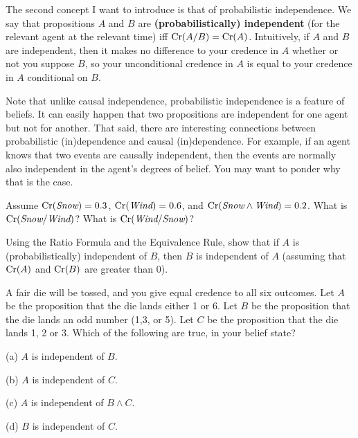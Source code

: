 The second concept I want to introduce is that of probabilistic
independence. We say that propositions $A$ and $B$ are
\textbf{(probabilistically) independent} (for the relevant agent at
the relevant time) iff $\text{Cr}(A/B) = \text{Cr}(A)$. Intuitively, if $A$ and $B$
are independent, then it makes no difference to your credence in $A$
whether or not you suppose $B$, so your unconditional credence in $A$
is equal to your credence in $A$ conditional on $B$.

Note that unlike causal independence, probabilistic independence is a
feature of beliefs. It can easily happen that two propositions are
independent for one agent but not for another. That said, there are
interesting connections between probabilistic (in)dependence and
causal (in)dependence. For example, if an agent knows that two events
are causally independent, then the events are normally also
independent in the agent's degrees of belief. You may want to ponder
why that is the case. 

\begin{exercise1}
  Assume $\text{Cr}(\emph{Snow}) = 0.3$, $\text{Cr}(\emph{Wind}) = 0.6$, and $\text{Cr}(\emph{Snow} \land
  \emph{Wind}) = 0.2$. What is $\text{Cr}(\emph{Snow}/\emph{Wind})$? What is $\text{Cr}(\emph{Wind}/\emph{Snow})$? 
\end{exercise1}

\begin{exercise2}
  Using the Ratio Formula and the Equivalence Rule, show that if $A$ is
  (probabilistically) independent of $B$, then $B$ is independent of $A$
  (assuming that $\text{Cr}(A)$ and $\text{Cr}(B)$ are greater than 0).
\end{exercise2}

\begin{exercise2}
  A fair die will be tossed, and you give equal credence to all six
  outcomes. Let $A$ be the proposition that the die lands either 1 or
  6. Let $B$ be the proposition that the die lands an odd number (1,3,
  or 5). Let $C$ be the proposition that the die lands 1, 2 or 3.
  Which of the following are true, in your belief state?
  \begin{exlist}
  \item[(a)] $A$ is independent of $B$. 
  \item[(b)] $A$ is independent of $C$.
  \item[(c)] $A$ is independent of $B \land C$.
  \item[(d)] $B$ is independent of $C$.
  \end{exlist}
\end{exercise2}

